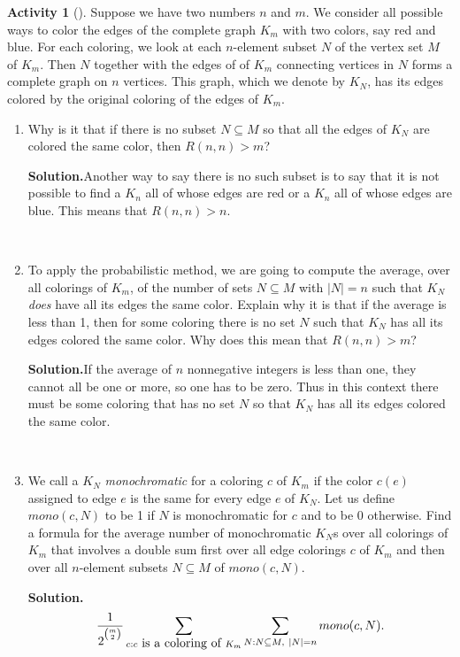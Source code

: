 \documentclass[10pt,]{book}
\theoremstyle{plain}
\theoremstyle{definition}
\newtheorem{activity}[project]{Activity}
\numberwithin{equation}{chapter}
\begin{document}
\begin{activity}[]\label{activity-35}
Suppose we have two numbers \(n\) and \(m\). We consider all possible ways to color the edges of the complete graph \(K_m\) with two colors, say red and blue. For each coloring, we look at each \(n\)-element subset \(N\) of the vertex set \(M\) of \(K_m\). Then \(N\) together with the edges of of \(K_m\) connecting vertices in \(N\) forms a complete graph on \(n\) vertices. This graph, which we denote by \(K_N\), has its edges colored by the original coloring of the edges of \(K_m\).%
~\par
\begin{enumerate}[label=(\alph*)]
 \item Why is it that if there is no subset \(N\subseteq M\) so that all the edges of \(K_N\) are colored the same color, then \(R(n,n)>m\)?%
\par\medskip\noindent%
\textbf{Solution.}\quad Another way to say there is no such subset is to say that it is not possible to find a \(K_n\) all of whose edges are red or a \(K_n\) all of whose edges are blue. This means that \(R(n,n)>n\).%

~\par
\item To apply the probabilistic method, we are going to compute the average, over all colorings of \(K_m\), of the number of sets \(N\subseteq M\) with \(|N|=n\) such that \(K_N\) \emph{does} have all its edges the same color. Explain why it is that if the average is less than 1, then for some coloring there is no set \(N\) such that \(K_N\) has all its edges colored the same color.  Why does this mean that \(R(n,n)>m\)?%
\par\medskip\noindent%
\textbf{Solution.}\quad If the average of \(n\) nonnegative integers is less than one, they cannot all be one or more, so one has to be zero. Thus in this context there must be some coloring that has no set \(N\) so that \(K_N\) has all its edges colored the same color.%

~\par
\item We call a \(K_N\) \emph{monochromatic} for a coloring \(c\) of \(K_m\) if the color \(c(e)\) assigned to edge \(e\) is the same for every edge \(e\) of \(K_N\).  Let us define \({ mono}(c,N)\) to be 1 if \(N\) is monochromatic for \(c\) and to be 0 otherwise.  Find a formula for the average number of monochromatic \(K_N\)s over all colorings of \(K_m\) that involves a double sum first over all edge colorings \(c\) of \(K_m\) and then over all \(n\)-element subsets \(N\subseteq M\) of \({
mono}(c,N)\).%
\par\medskip\noindent%
\textbf{Solution.}\quad %
\begin{equation*}
{1\over 2^{^{m\choose 2}}}\sum_{c:c\mbox{~is a coloring
of~} K_m}\sum_{N:N\subseteq M,~|N|=n}{ mono}(c,N).
\end{equation*}


\end{enumerate}
\end{activity}
\end{document}
